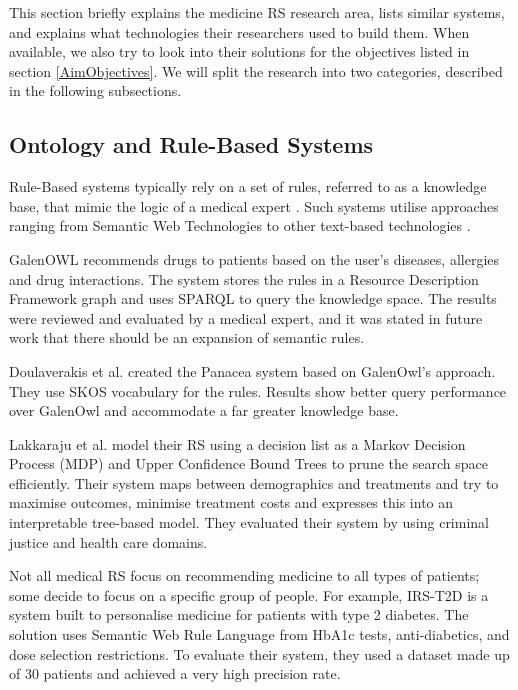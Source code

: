 \label{Background}

This section briefly explains the medicine RS research area, lists similar
systems, and explains what technologies their researchers used to build
them. When available, we also try to look into their solutions for the
objectives listed in section \ref{AimObjectives}. We will split the
research into two categories, described in the following subsections.

\subsection{Ontology and Rule-Based Systems}

Rule-Based systems typically rely on a set of rules, referred to as a knowledge
base, that mimic the logic of a medical expert \cite{Stark2019}.
Such systems utilise approaches ranging from Semantic Web
Technologies \cite{Doulaverakis2014, Rodriguez2009} to other text-based
technologies \cite{Hamed2012}.

GalenOWL \cite{Doulaverakis2012} recommends drugs to patients based on the
user's diseases, allergies and drug interactions. The system stores the
rules in a Resource Description Framework graph and uses SPARQL to query
the knowledge space. The results were reviewed and evaluated by a medical
expert, and it was stated in future work that there should be an expansion
of semantic rules. 

Doulaverakis et al. created the Panacea \cite{Doulaverakis2014} system based on
GalenOwl's approach. They use SKOS vocabulary for the rules. Results show
better query performance over GalenOwl and accommodate a far greater knowledge
base.


Lakkaraju et al.\cite{pmlr-v54-lakkaraju17a} model their RS using a decision list
as a Markov Decision Process (MDP) and Upper Confidence Bound Trees to
prune the search space efficiently. Their system maps between demographics
and treatments and try to maximise outcomes, minimise treatment costs and
expresses this into an interpretable tree-based model. They evaluated
their system by using criminal justice and health care domains. 


Not all medical RS focus on recommending medicine to all types of
patients; some decide to focus on a specific group of people. For example,
IRS-T2D \cite{Mahmoud2016} is a system built to personalise medicine for
patients with type 2 diabetes. The solution uses Semantic Web Rule Language
from HbA1c  tests, anti-diabetics, and dose selection restrictions. To evaluate
their system, they used a dataset made up of 30 patients and achieved a very
high precision rate. 

